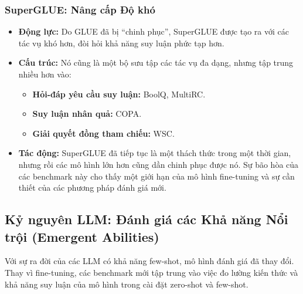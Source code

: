 \subsubsection{SuperGLUE: Nâng cấp Độ khó}
\begin{itemize}
    \item \textbf{Động lực:} Do GLUE đã bị “chinh phục”, SuperGLUE được tạo ra với các tác vụ khó hơn, đòi hỏi khả năng suy luận phức tạp hơn.
    \item \textbf{Cấu trúc:} Nó cũng là một bộ sưu tập các tác vụ đa dạng, nhưng tập trung nhiều hơn vào:
        \begin{itemize}
            \item \textbf{Hỏi-đáp yêu cầu suy luận:} BoolQ, MultiRC.
            \item \textbf{Suy luận nhân quả:} COPA.
            \item \textbf{Giải quyết đồng tham chiếu:} WSC.
        \end{itemize}
    \item \textbf{Tác động:} SuperGLUE đã tiếp tục là một thách thức trong một thời gian, nhưng rồi các mô hình lớn hơn cũng dần chinh phục được nó. Sự bão hòa của các benchmark này cho thấy một giới hạn của mô hình fine-tuning và sự cần thiết của các phương pháp đánh giá mới.
\end{itemize}

\subsection{Kỷ nguyên LLM: Đánh giá các Khả năng Nổi trội (Emergent Abilities)}
\label{ssec:llm_benchmarks}
Với sự ra đời của các LLM có khả năng few-shot, mô hình đánh giá đã thay đổi. Thay vì fine-tuning, các benchmark mới tập trung vào việc đo lường kiến thức và khả năng suy luận của mô hình trong cài đặt zero-shot và few-shot.

